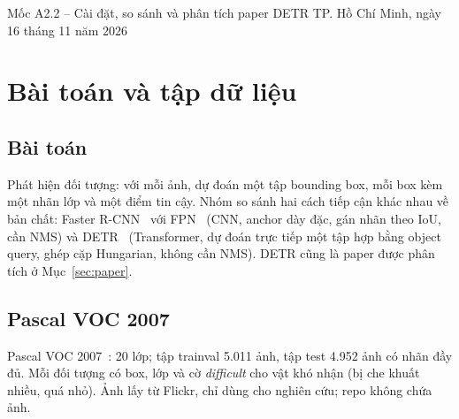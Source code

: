 \documentclass[11pt, a4paper]{article}
\begin{document}
\sloppy   %

          {Mốc A2.2 -- Cài đặt, so sánh và phân tích paper DETR}
          {TP. Hồ Chí Minh, ngày 16 tháng 11 năm 2026}

\begin{abstract}
Nhóm so sánh Faster R-CNN ResNet-50-FPN (CNN, anchor + NMS) và DETR ResNet-50 (Transformer, dự đoán tập hợp bằng ghép cặp Hungarian) trên Pascal VOC 2007, với cùng dữ liệu, cùng quy tắc resize và cùng cách đánh giá, đồng thời phân tích paper DETR (Carion và cộng sự, ECCV 2020). Khi fine-tune từ checkpoint COCO, DETR đạt mAP@0.5 86,14\% và AP@[.5:.95] 63,0\% trên VOC 2007 test, so với 84,63\% và 56,0\% của Faster R-CNN, và chạy nhanh hơn (28,3 so với 17,5 FPS). Kết quả tái hiện đúng xu hướng của paper: DETR tốt hơn nhiều ở vật lớn (AP$_L$ 71,7 so với 60,8) nhưng kém ở vật nhỏ (AP$_S$ 20,6 so với 26,5). Khi không có pretrain cho bài toán phát hiện (chỉ backbone ImageNet), Faster R-CNN vẫn đạt 76,4\% sau 10 epoch, còn DETR chỉ đạt 2,8\% sau 20 epoch, xác nhận hạn chế lớn nhất của paper là hội tụ chậm. Thí nghiệm theo từng tầng decoder kiểm chứng thêm nhận định rằng DETR không cần NMS.
\end{abstract}

\tableofcontents
\newpage

\section{Bài toán và tập dữ liệu}

\subsection{Bài toán}
Phát hiện đối tượng: với mỗi ảnh, dự đoán một tập bounding box, mỗi box kèm một nhãn lớp và một điểm tin cậy. Nhóm so sánh hai cách tiếp cận khác nhau về bản chất: Faster R-CNN~\cite{ren2015faster} với FPN~\cite{lin2017fpn} (CNN, anchor dày đặc, gán nhãn theo IoU, cần NMS) và DETR~\cite{carion2020detr} (Transformer, dự đoán trực tiếp một tập hợp bằng object query, ghép cặp Hungarian, không cần NMS). DETR cũng là paper được phân tích ở Mục~\ref{sec:paper}.

\subsection{Pascal VOC 2007}
Pascal VOC 2007~\cite{everingham2010voc}: 20 lớp; tập trainval 5.011 ảnh, tập test 4.952 ảnh có nhãn đầy đủ. Mỗi đối tượng có box, lớp và cờ \emph{difficult} cho vật khó nhận (bị che khuất nhiều, quá nhỏ). Ảnh lấy từ Flickr, chỉ dùng cho nghiên cứu; repo không chứa ảnh.
\end{document}
